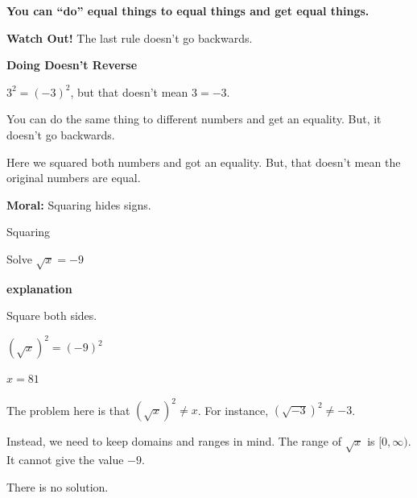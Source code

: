 \documentclass{ximera}
\begin{document}
\begin{center}


\textbf{\textcolor{purple!85!blue}{You can ``do'' equal things to equal things and get equal things.}}


\end{center}



\textbf{\textcolor{red!70!black}{Watch Out!}} The last rule doesn't go backwards.




\begin{warning}  \textbf{\textcolor{red!70!black}{Doing Doesn't Reverse}}  



$3^2 = (-3)^2$, but that doesn't mean $3=-3$.


You can do the same thing to different numbers and get an equality.  But, it doesn't go backwards.  

Here we squared both numbers and got an equality.  But, that doesn't mean the original numbers are equal.


\end{warning}



\textbf{Moral:} Squaring hides signs.


\begin{example} Squaring


Solve $\sqrt{x} = -9$

\textbf{\textcolor{red!75!green}{explanation}} 

Square both sides.


$(\sqrt{x})^2 = (-9)^2$

$x = 81$



The problem here is that  $(\sqrt{x})^2 \ne x$.  For instance, $(\sqrt{-3})^2 \ne -3$.


Instead, we need to keep domains and ranges in mind.  The range of $\sqrt{x}$ is $[0, \infty)$. It cannot give the value $-9$.


There is no solution.



\end{example}
\end{document}
